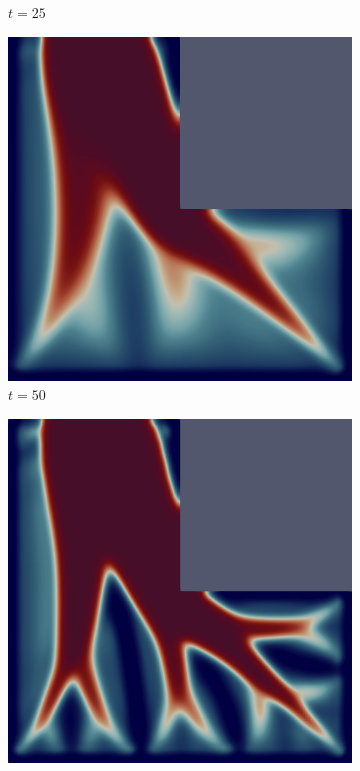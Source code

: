\begin{figure}[H]
\begin{subfigure}{.4\textwidth}
        \caption{$t = 25$}
    \end{subfigure}
    \begin{subfigure}{.4\textwidth}
        \includegraphics[width=\textwidth]{imgs/LShape/third.png}
        \caption{$t = 50$}
    \end{subfigure}
    \begin{subfigure}{.4\textwidth}
        \includegraphics[width=\textwidth]{imgs/LShape/fourth.png}

\end{subfigure}
\end{figure}
